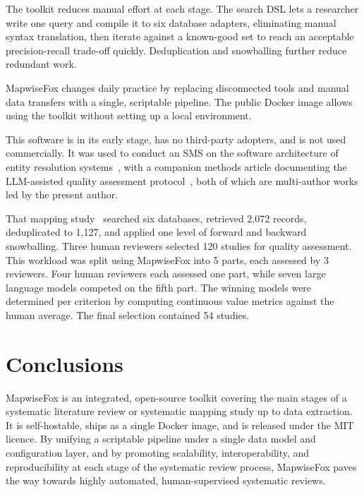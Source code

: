 \documentclass[preprint,12pt, a4paper]{elsarticle}
\begin{document}
The toolkit reduces manual effort at each stage. The search DSL lets a
researcher write one query and compile it to six database adapters,
eliminating manual syntax translation, then iterate against a known-good
set to reach an acceptable precision-recall trade-off quickly.
Deduplication and snowballing further reduce redundant work.

MapwiseFox changes daily practice by replacing disconnected tools and
manual data transfers with a single, scriptable pipeline. The public Docker image
allows using the toolkit without setting up a local environment.

This software is in its early stage, has no third-party adopters, and is not
used commercially. It was used to conduct an SMS on the software architecture
of entity resolution systems~\cite{olar2026sms}, with a companion methods
article documenting the LLM-assisted quality assessment
protocol~\cite{olar2026methodsx}, both of which are multi-author works led by the
present author.

That mapping study~\cite{olar2026sms} searched six databases,
retrieved 2{,}072 records, deduplicated to 1{,}127, and applied one level of
forward and backward snowballing. Three human reviewers selected 120 studies
for quality assessment. This workload was split using MapwiseFox into 5
parts, each assessed by 3 reviewers. Four human reviewers each assessed one part,
while seven large language models competed on the fifth part. The winning models were
determined per criterion by computing continuous value metrics against the human
average. The final selection contained 54 studies.


\section{Conclusions}

MapwiseFox is an integrated, open-source toolkit covering the main stages
of a systematic literature review or systematic mapping study up to data
extraction. It is self-hostable, ships as a single Docker image, and is
released under the MIT licence. By unifying a scriptable pipeline under a
single data model and configuration layer, and by promoting scalability,
interoperability, and reproducibility at each stage of the systematic review
process, MapwiseFox paves the way towards highly automated, human-supervised
systematic reviews.
\end{document}
